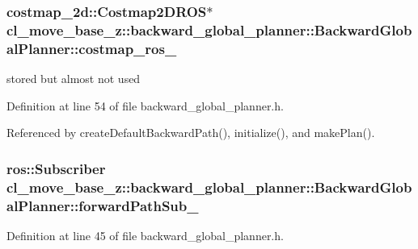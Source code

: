 \subsubsection[{\texorpdfstring{costmap\+\_\+ros\+\_\+}{costmap_ros_}}]{\setlength{\rightskip}{0pt plus 5cm}costmap\+\_\+2d\+::\+Costmap2\+D\+R\+OS$\ast$ cl\+\_\+move\+\_\+base\+\_\+z\+::backward\+\_\+global\+\_\+planner\+::\+Backward\+Global\+Planner\+::costmap\+\_\+ros\+\_\+\hspace{0.3cm}{\ttfamily [private]}}\hypertarget{classcl__move__base__z_1_1backward__global__planner_1_1BackwardGlobalPlanner_a7103c15e6540a514acd421c3c6e194a4}{}\label{classcl__move__base__z_1_1backward__global__planner_1_1BackwardGlobalPlanner_a7103c15e6540a514acd421c3c6e194a4}


stored but almost not used 



Definition at line 54 of file backward\+\_\+global\+\_\+planner.\+h.



Referenced by create\+Default\+Backward\+Path(), initialize(), and make\+Plan().

\subsubsection[{\texorpdfstring{forward\+Path\+Sub\+\_\+}{forwardPathSub_}}]{\setlength{\rightskip}{0pt plus 5cm}ros\+::\+Subscriber cl\+\_\+move\+\_\+base\+\_\+z\+::backward\+\_\+global\+\_\+planner\+::\+Backward\+Global\+Planner\+::forward\+Path\+Sub\+\_\+\hspace{0.3cm}{\ttfamily [private]}}\hypertarget{classcl__move__base__z_1_1backward__global__planner_1_1BackwardGlobalPlanner_a27fbf960495d95b87cc50e8556c79d9f}{}\label{classcl__move__base__z_1_1backward__global__planner_1_1BackwardGlobalPlanner_a27fbf960495d95b87cc50e8556c79d9f}


Definition at line 45 of file backward\+\_\+global\+\_\+planner.\+h.



